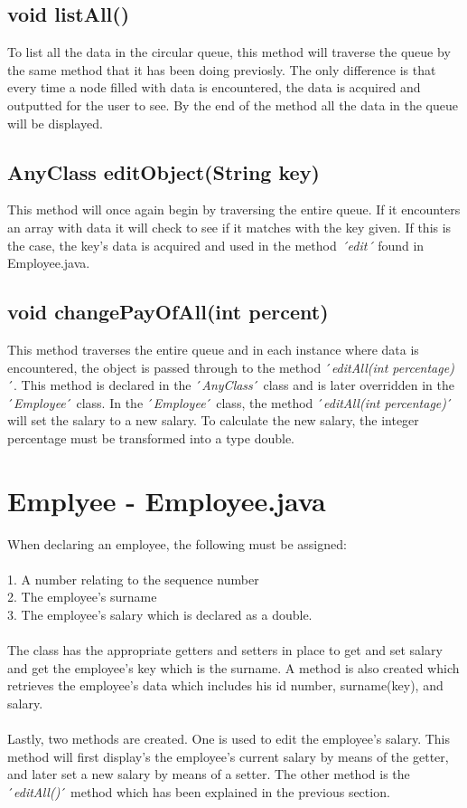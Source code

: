 \documentclass[12pt]{article}
\begin{document}
\subsection{void listAll()}
To list all the data in the circular queue, this method will traverse the queue by the same method that it has been doing previosly. The only difference is that every time a node filled with data is encountered, the data is acquired and outputted for the user to see. By the end of the method all the data in the queue will be displayed.\\


\subsection{AnyClass editObject(String key)}
This method will once again begin by traversing the entire queue. If it encounters an array with data it will check to see if it matches with the key given. If this is the case, the key's data is acquired and used in the method \emph{´edit´} found in Employee.java. 

\subsection{void changePayOfAll(int percent)}
This method traverses the entire queue and in each instance where data is encountered, the object is passed through to the method ´\emph{editAll(int percentage)}´. This method is declared in the ´\emph{AnyClass}´ class and is later overridden in the ´\emph{Employee}´ class. In the ´\emph{Employee}´ class, the method ´\emph{editAll(int percentage)}´ will set the salary to a new salary. To calculate the new salary, the integer percentage must be transformed into a type double.
\bigskip


\section{Emplyee - Employee.java}

When declaring an employee, the following must be assigned:
\\
\\1. A number relating to the sequence number
\\2. The employee's surname
\\3. The employee's salary which is declared as a double.\\
\\The class has the appropriate getters and setters in place to get and set salary and get the employee's key which is the surname. A method is also created which retrieves the employee's data which includes his id number, surname(key), and salary.\\
\\Lastly, two methods are created. One is used to edit the employee's salary. This method will first display's the employee's current salary by means of the getter, and later set a new salary by means of a setter. The other method is the ´\emph{editAll()}´ method which has been explained in the previous section.
\bigskip 
\end{document}
